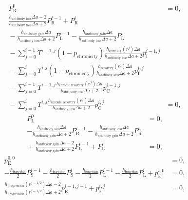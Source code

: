 \documentclass[12pt]{article}
\begin{document}
\begin{equation}
  \begin{split}
    P_{\mathrm{R}}^0 &= 0,
    \\
    \frac{h_{\text{antibody loss}} \Delta a - 2}
    {h_{\text{antibody loss}} \Delta a + 2}
    P_{\mathrm{R}}^{i - 1}
    + P_{\mathrm{R}}^i
    \\ {}
    - \frac{h_{\text{antibody gain}} \Delta a}
    {h_{\text{antibody loss}} \Delta a + 2}
    P_{\mathrm{L}}^{i - 1}
    - \frac{h_{\text{antibody gain}} \Delta a}
    {h_{\text{antibody loss}} \Delta a + 2}
    P_{\mathrm{L}}^i
    \\ {}
    - \sum_{j = 0}^{i - 1}
    T^{i - 1, j} \left(1 - p_{\text{chronicity}}\right)
    \frac{h_{\text{recovery}}(r^j) \Delta a}
    {h_{\text{antibody loss}} \Delta a + 2}
    p_{\mathrm{I}}^{i - 1, j}
    \\ {}
    - \sum_{j = 0}^i
    T^{i, j} \left(1 - p_{\text{chronicity}}\right)
    \frac{h_{\text{recovery}}(r^j) \Delta a}
    {h_{\text{antibody loss}} \Delta a + 2}
    p_{\mathrm{I}}^{i, j}
    \\ {}
    - \sum_{j = 0}^{i - 1}
    T^{i - 1, j}
    \frac{h_{\text{chronic recovery}}(r^j) \Delta a}
    {h_{\text{antibody loss}} \Delta a + 2}
    p_{\mathrm{C}}^{i - 1, j}
    \\ {}
    - \sum_{j = 0}^i
    T^{i, j}
    \frac{h_{\text{chronic recovery}}(r^j) \Delta a}
    {h_{\text{antibody loss}} \Delta a + 2}
    p_{\mathrm{C}}^{i, j}
    &= 0,
  \end{split}
\end{equation}
\begin{equation}
  \begin{split}
    P_{\mathrm{L}}^0 &= 0,
    \\
    - \frac{h_{\text{antibody loss}} \Delta a}
    {h_{\text{antibody gain}} \Delta a + 2}
    P_{\mathrm{R}}^{i - 1}
    - \frac{h_{\text{antibody loss}} \Delta a}
    {h_{\text{antibody gain}} \Delta a + 2}
    P_{\mathrm{R}}^i
    \\ {}
    + \frac{h_{\text{antibody gain}} \Delta a - 2}
    {h_{\text{antibody gain}} \Delta a + 2}
    P_{\mathrm{L}}^{i - 1}
    + P_{\mathrm{L}}^i
    &= 0,
  \end{split}
\end{equation}
\begin{equation}
  \begin{split}
    p_{\mathrm{E}}^{0, 0} &= 0,
    \\
    - \frac{h_{\text{infection}}}{2} P_{\mathrm{S}}^{i - 1}
    - \frac{h_{\text{infection}}}{2} P_{\mathrm{S}}^i
    - \frac{h_{\text{infection}}}{2} P_{\mathrm{L}}^{i - 1}
    - \frac{h_{\text{infection}}}{2} P_{\mathrm{L}}^i
    + p_{\mathrm{E}}^{i, 0}
    &= 0,
    \\
    \frac{h_{\text{progression}}(r^{j - 1 / 2}) \Delta a - 2}
    {h_{\text{progression}}(r^{j - 1 / 2}) \Delta a + 2}
    p_{\mathrm{E}}^{i - 1, j - 1}
    + p_{\mathrm{E}}^{i, j}
    &= 0,
  \end{split}
\end{equation}
\end{document}
